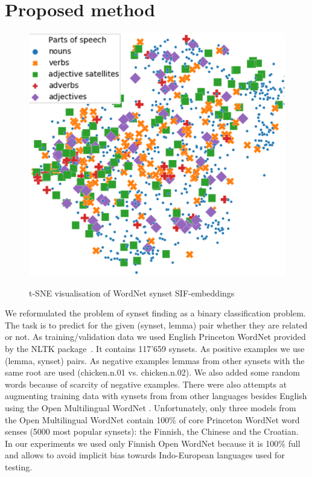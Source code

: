 \documentclass[11pt,a4paper]{article}
\begin{document}
\section{Proposed method}
\begin{figure}
	
	\centering
	\small
	\includegraphics[scale=0.5]{wordnet-pos3}\\
	
	\caption{t-SNE visualisation of WordNet synset SIF-embeddings}
	\label{wordnet-pos}
\end{figure}
We reformulated the problem of synset finding as a binary classification problem. The task is to predict for the given (synset, lemma) pair whether they are related or not. As training/validation data we used English Princeton WordNet \cite{wordnet} provided by the NLTK package~\cite{nltk}. It contains 117'659 synsets. As positive examples we use (lemma, synset) pairs. As negative examples lemmas from other synsets with the same root are used (chicken.n.01 vs. chicken.n.02). We also added some random words because of scarcity of negative examples. There were also attempts at augmenting training data with synsets from from other languages besides English using the Open Multilingual WordNet \cite{Bond2012, bond-wordnet}. Unfortunately, only three models from the Open Multilingual WordNet contain 100\% of core Princeton WordNet word senses (5000 most popular synsets): the Finnish, the Chinese and the Croatian. In our experiments we used only Finnish Open WordNet because it is 100\% full and allows to avoid implicit bias towards Indo-European languages used for testing.
\end{document}
